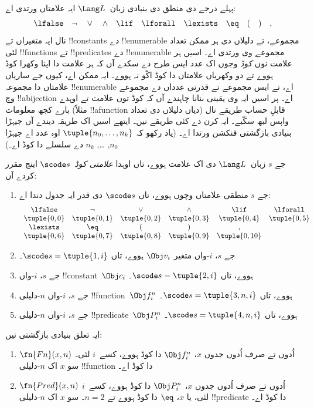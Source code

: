 \documentclass[../../../include/open-logic-section]{subfiles}
\begin{document}

پہلے درجے دی منطق دی بنیادی زبان~$\Lang L$ ایہ علامتاں ورتدی اے:
\[
\lfalse \quad \lnot \quad \lor \quad \land \quad \lif \quad \lforall
\quad \lexists \quad \eq \quad ( \quad ) \quad ,
\]
نال ایہ متغیراں تے !!{constant}s دے !!{enumerable} مجموعے،
تے دلیلاں دی ہر ممکن تعداد لئی !!{function}s تے !!{predicate}s
دے !!{enumerable} مجموعے وی ورتدی اے۔ اسیں ہر علامت نوں
\emph{کوڈ} وجوں اک عدد ایس طرح دے سکدے آں کہ ہر علامت دا
اپنا وکھرا کوڈ ہووے تے دو وکھریاں علامتاں دا کوڈ اکّو نہ ہووے۔
ایہ ممکن اے، کیوں جے ساریاں علامتاں دا مجموعہ !!{enumerable}
اے، تے ایس مجموعے تے قدرتی عدداں دے مجموعے وچ !!a{bijection}
اے۔ پر اسیں ایہ وی یقینی بنانا چاہندے آں کہ کوڈ توں علامت تے
اوہدے بارے کجھ معلومات (مثلاً !!a{function} دیاں دلیلاں دی
تعداد) قابلِ حساب طریقے نال واپس لبھ سکّیے۔ ایہ کرن دے کئی
طریقے نیں۔ ایتھے اسیں اک طریقہ دیندے آں جیہڑا بنیادی بازگشتی
فنکشن ورتدا اے۔ (یاد رکھو کہ $\tuple{n_0, \dots, n_k}$ اوہ عدد
اے جیہڑا $n_0$, \dots, $n_k$ دے سلسلے دا کوڈ اے۔)

\begin{defn}
جے $s$ زبان~$\Lang L$ دی اک علامت ہووے، تاں
اوہدا \emph{علامتی کوڈ}~$\scode s$ اینج مقرر کردے آں:
\begin{enumerate}
\item جے $s$ منطقی علامتاں وچوں ہووے، تاں
  $\scode s$ دی قدر ایہ جدول دندا اے:
\[
\begin{array}{cccccccccc}
  \lfalse & \lnot & \lor & \land & \lif & \lforall \\
\tuple{0, 0} & \tuple{0, 1} & \tuple{0, 2} & \tuple{0, 3} &
\tuple{0, 4} & \tuple{0, 5} \\
\lexists & \eq & ( & ) & ,\\
\tuple{0, 6} & \tuple{0, 7} &
\tuple{0, 8} & \tuple{0, 9} & \tuple{0, 10}
\end{array}
\]
\item جے $s$، $i$-واں متغیر $\Obj v_i$ ہووے،
  تاں $\scode s = \tuple{1, i}$۔
\item جے $s$، $i$-واں !!{constant}~$\Obj c_i$
  ہووے، تاں $\scode s = \tuple{2, i}$۔
\item جے $s$، $i$-واں $n$-دلیلی
  !!{function}~$\Obj f_i^n$ ہووے، تاں
  $\scode s = \tuple{3, n, i}$۔
\item جے $s$، $i$-واں $n$-دلیلی
  !!{predicate}~$\Obj P_i^n$ ہووے، تاں
  $\scode s = \tuple{4, n, i}$۔
\end{enumerate}
\end{defn}

\begin{prop}
ایہ تعلق بنیادی بازگشتی نیں:
\begin{enumerate}
\item $\fn{Fn}(x, n)$ اُدوں تے صرف اُدوں جدوں $x$،
  $\Obj f^n_i$ دا کوڈ ہووے، کسے~$i$ لئی۔ سو $x$ اک $n$-دلیلی !!{function} دا کوڈ اے۔
\item $\fn{Pred}(x, n)$ اُدوں تے صرف اُدوں جدوں $x$،
  $\Obj P^n_i$ دا کوڈ ہووے، کسے~$i$ لئی، یا $x$، $\eq$ دا کوڈ ہووے تے $n = 2$۔ سو $x$ اک
  $n$-دلیلی !!{predicate} دا کوڈ اے۔
\end{enumerate}
\end{prop}
\end{document}

